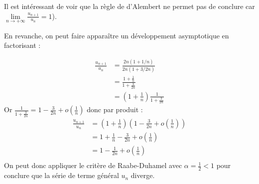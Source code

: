 {\begin{enumerate}
{			Il est intéressant de voir que la règle de d'Alembert ne permet pas de conclure car $\lim\limits_{n \to +\infty} \frac{u_{n+1}}{u_n} = 1$). 
			
			En revanche, on peut faire apparaître un développement asymptotique en factorisant :
			
			\begin{align*}
			\frac{u_{n+1}}{u_n} &= \frac{2n(1+1/n)}{2n(1+3/2n)} \\
			&= \frac{1+\frac{1}{n}}{1+\frac{3}{2n}} \\
			&= \left(1+\frac{1}{n} \right) \frac{1}{1+\frac{3}{2n}}
			\end{align*}
			Or $\frac{1}{1+\frac{3}{2n}} = 1-\frac{3}{2n} + o(\frac{1}{n})$ donc par produit : 
			\begin{align*}
			\frac{u_{n+1}}{u_n} &= \left(1+\frac{1}{n} \right) \left(1-\frac{3}{2n} +o\left(\frac{1}{n}\right)  \right) \\
			&= 1 + \frac{1}{n} - \frac{3}{2n} + o\left(\frac{1}{n}\right) \\
			&= 1 - \frac{1}{2n}  + o\left(\frac{1}{n}\right) \\
			\end{align*}
			On peut donc appliquer le critère de Raabe-Duhamel avec $\alpha = \frac{1}{2} <1$ pour conclure que la série de terme général $u_n$ diverge. 
		}
	\end{enumerate}
}

